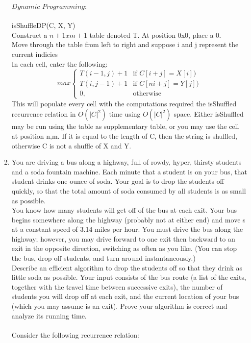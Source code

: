 \documentclass{article}
\begin{document}
\begin{enumerate}
$Dynamic$ $Programming:$\\
\\
isShuffleDP(C, X, Y)\\

Construct a $n+1 x m+1$ table denoted T. At position 0x0, place a 0. \\
Move through the table from left to right and suppose i and j represent the current indicies\\
In each cell, enter the following: \\
    \[
     max
    \begin{cases}
        T(i - 1, j) + 1  & \text{if } C[i+j] = X[i])\\
        T(i, j - 1) + 1  & \text{if } C[ni+j] = Y[j])\\
        0, & \text{otherwise}
    \end{cases}
    \]
This will populate every cell with the computations required the isShuffled recurrence relation in $O(|C|^2)$ time using $O(|C|^2)$ space. Either isShuffled may be run using the table as supplementary table, or you may use the cell at position n,m. If it is equal to the length of C, then the string is shuffled, otherwise C is not a shuffle of X and Y.


\item 
You are driving a bus along a highway, full of rowdy, hyper, thirsty students and a soda fountain machine. Each minute that a student is on your bus, that student drinks one ounce of soda. Your goal is to drop the students off quickly, so that the total amount of soda consumed by all students is as small as possible.\\

You know how many students will get off of the bus at each exit. Your bus begins somewhere along the highway (probably not at either end) and move s at a constant speed of 3.14 miles per hour. You must drive the bus along the highway; however, you may drive forward to one exit then backward to an exit in the opposite direction, switching as often as you like. (You can stop the bus, drop off students, and turn around instantaneously.)\\

Describe an efficient algorithm to drop the students off so that they drink as little soda as possible. Your input consists of the bus route (a list of the exits, together with the travel time between successive exits), the number of students you will drop off at each exit, and the current location of your bus (which you may assume is an exit). Prove your algorithm is correct and analyze its running time.\\
\\
Consider the following recurrence relation:\\


\end{enumerate}
\end{document}

